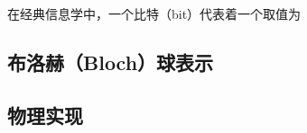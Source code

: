 
\begin{issues}
\issueDraft
\end{issues}


在经典信息学中，一个比特（bit）代表着一个取值为

\subsection{布洛赫（Bloch）球表示}

\subsection{物理实现}